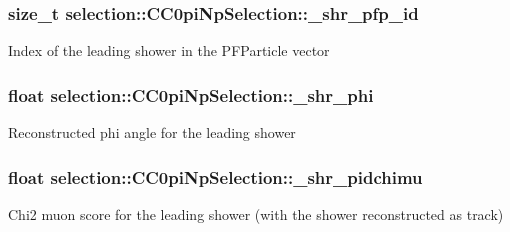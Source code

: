 \subsubsection[{\texorpdfstring{\+\_\+shr\+\_\+pfp\+\_\+id}{_shr_pfp_id}}]{\setlength{\rightskip}{0pt plus 5cm}size\+\_\+t selection\+::\+C\+C0pi\+Np\+Selection\+::\+\_\+shr\+\_\+pfp\+\_\+id\hspace{0.3cm}{\ttfamily [private]}}\hypertarget{classselection_1_1CC0piNpSelection_a21f98860ef8bd0ad8d8e029a47ef6f1e}{}\label{classselection_1_1CC0piNpSelection_a21f98860ef8bd0ad8d8e029a47ef6f1e}
Index of the leading shower in the P\+F\+Particle vector 
\subsubsection[{\texorpdfstring{\+\_\+shr\+\_\+phi}{_shr_phi}}]{\setlength{\rightskip}{0pt plus 5cm}float selection\+::\+C\+C0pi\+Np\+Selection\+::\+\_\+shr\+\_\+phi\hspace{0.3cm}{\ttfamily [private]}}\hypertarget{classselection_1_1CC0piNpSelection_a8706a83b3dc2e2c3857ada556392f16f}{}\label{classselection_1_1CC0piNpSelection_a8706a83b3dc2e2c3857ada556392f16f}
Reconstructed phi angle for the leading shower 
\subsubsection[{\texorpdfstring{\+\_\+shr\+\_\+pidchimu}{_shr_pidchimu}}]{\setlength{\rightskip}{0pt plus 5cm}float selection\+::\+C\+C0pi\+Np\+Selection\+::\+\_\+shr\+\_\+pidchimu\hspace{0.3cm}{\ttfamily [private]}}\hypertarget{classselection_1_1CC0piNpSelection_a63840908c268c89d30e6728ac6cb1036}{}\label{classselection_1_1CC0piNpSelection_a63840908c268c89d30e6728ac6cb1036}
Chi2 muon score for the leading shower (with the shower reconstructed as track) 
